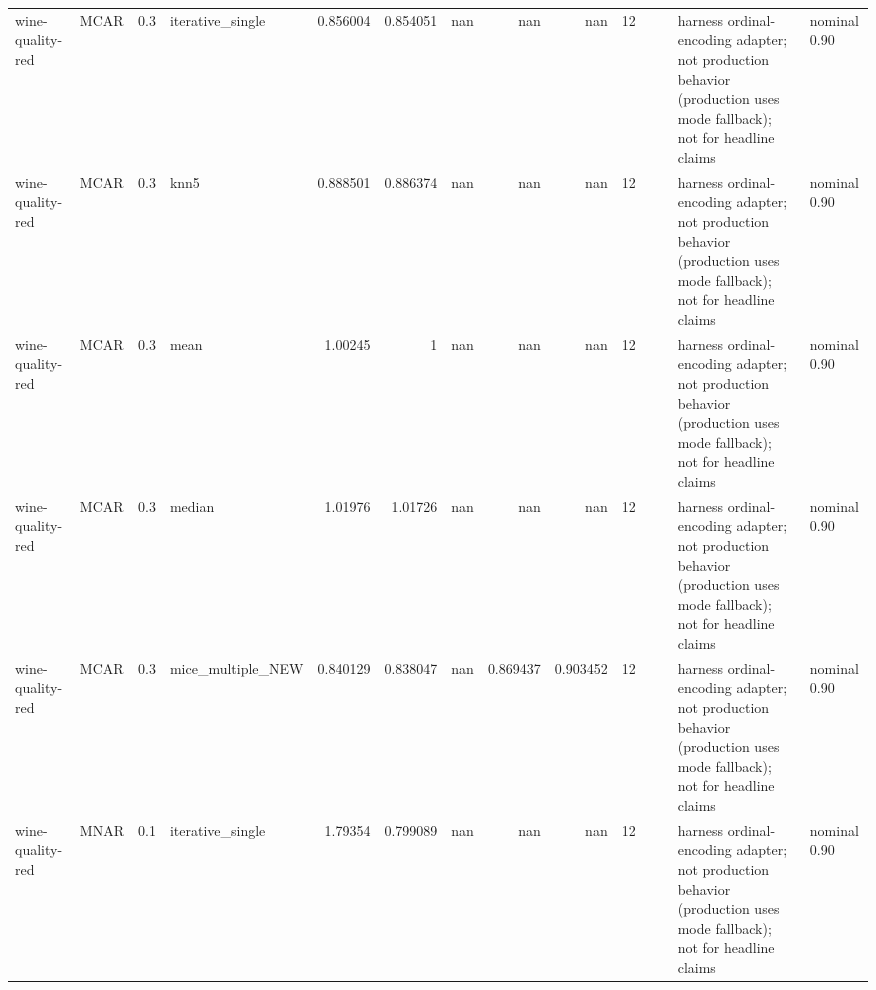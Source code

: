 \begin{table}[ht]
\begin{tabular}{llrlrrrrrrllll}
 wine-quality-red     & MCAR        &         0.3 & iterative\_single  &       0.856004 &             0.854051 &               nan        &                     nan        &                       nan        &        12 &                    &                                         & harness ordinal-encoding adapter; not production behavior (production uses mode fallback); not for headline claims & nominal 0.90              \\
 wine-quality-red     & MCAR        &         0.3 & knn5              &       0.888501 &             0.886374 &               nan        &                     nan        &                       nan        &        12 &                    &                                         & harness ordinal-encoding adapter; not production behavior (production uses mode fallback); not for headline claims & nominal 0.90              \\
 wine-quality-red     & MCAR        &         0.3 & mean              &       1.00245  &             1        &               nan        &                     nan        &                       nan        &        12 &                    &                                         & harness ordinal-encoding adapter; not production behavior (production uses mode fallback); not for headline claims & nominal 0.90              \\
 wine-quality-red     & MCAR        &         0.3 & median            &       1.01976  &             1.01726  &               nan        &                     nan        &                       nan        &        12 &                    &                                         & harness ordinal-encoding adapter; not production behavior (production uses mode fallback); not for headline claims & nominal 0.90              \\
 wine-quality-red     & MCAR        &         0.3 & mice\_multiple\_NEW &       0.840129 &             0.838047 &               nan        &                       0.869437 &                         0.903452 &        12 &                    &                                         & harness ordinal-encoding adapter; not production behavior (production uses mode fallback); not for headline claims & nominal 0.90              \\
 wine-quality-red     & MNAR        &         0.1 & iterative\_single  &       1.79354  &             0.799089 &               nan        &                     nan        &                       nan        &        12 &                    &                                         & harness ordinal-encoding adapter; not production behavior (production uses mode fallback); not for headline claims & nominal 0.90              \\

\end{tabular}
\end{table}

